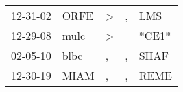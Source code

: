 \begin{supertabular}{p{0.07\textwidth}p{0.06\textwidth}p{0.02\textwidth}p{0.02\textwidth}p{0.06\textwidth}}
 12-31-02\textsuperscript{} &  ORFE\textsuperscript{} &  \textgreater &  , &   LMS\textsuperscript{} \\
 12-29-08\textsuperscript{} &  mulc\textsuperscript{} &  \textgreater &    &                   *CE1* \\
 02-05-10\textsuperscript{} &  blbc\textsuperscript{} &             , &  , &  SHAF\textsuperscript{} \\
 12-30-19\textsuperscript{} &  MIAM\textsuperscript{} &             , &  , &  REME\textsuperscript{} \\
\end{supertabular}
